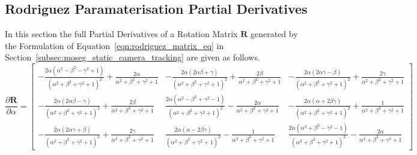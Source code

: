 \label{appendix:mathematical}
\begin{landscape}
\subsection{Rodriguez Paramaterisation Partial Derivatives}
In this section the full Partial Derivatives of a Rotation Matrix \(\bm{R}\)
generated by the Formulation of Equation~\ref{eqn:rodriguez_matrix_eq} in
Section~\ref{subsec:moseg_static_camera_tracking} are given as follows.
\begin{equation}
  \label{eqn:rodrigues_full_alpha_deriv}
  \frac{\partial \bm{R}}{\partial \alpha} =
    \begin{bmatrix}
      - \frac{2 \alpha \left(\alpha^{2} - \beta^{2} - \gamma^{2} +
          1\right)}{\left(\alpha^{2} + \beta^{2} + \gamma^{2} + 1\right)^{2}} +
      \frac{2 \alpha}{\alpha^{2} + \beta^{2} + \gamma^{2} + 1} &
      - \frac{2 \alpha \left(2 \alpha \beta + \gamma\right)}{\left(\alpha^{2} +
          \beta^{2} + \gamma^{2} + 1\right)^{2}} + \frac{2 \beta}{\alpha^{2} +
        \beta^{2} + \gamma^{2} + 1} &
      - \frac{2 \alpha \left(2 \alpha \gamma - \beta\right)}{\left(\alpha^{2} +
          \beta^{2} + \gamma^{2} + 1\right)^{2}}
      + \frac{2 \gamma}{\alpha^{2} + \beta^{2} + \gamma^{2} + 1}\\
      -\frac{2 \alpha \left(2 \alpha \beta - \gamma\right)}{\left(\alpha^{2} +
          \beta^{2} + \gamma^{2} + 1\right)^{2}} + \frac{2 \beta}{\alpha^{2} +
        \beta^{2} + \gamma^{2} + 1} &
      \frac{2 \alpha \left(\alpha^{2} - \beta^{2} + \gamma^{2} - 1\right)}
      {\left(\alpha^{2} + \beta^{2} + \gamma^{2} + 1\right)^{2}} - \frac{2 \alpha}
      {\alpha^{2} + \beta^{2} + \gamma^{2} + 1} &
      - \frac{2 \alpha \left(\alpha + 2 \beta \gamma\right)}
      {\left(\alpha^{2} + \beta^{2} + \gamma^{2} + 1\right)^{2}} +
      \frac{1}{\alpha^{2} + \beta^{2} + \gamma^{2} + 1}\\
      - \frac{2 \alpha \left(2 \alpha \gamma + \beta\right)}{\left(\alpha^{2} +
          \beta^{2} + \gamma^{2} + 1\right)^{2}} + \frac{2 \gamma}{\alpha^{2} +
        \beta^{2} + \gamma^{2} + 1} &
      \frac{2 \alpha \left(\alpha - 2 \beta \gamma\right)}
      {\left(\alpha^{2} + \beta^{2} + \gamma^{2} + 1\right)^{2}} -
      \frac{1}{\alpha^{2} + \beta^{2} + \gamma^{2} + 1} &
      \frac{2 \alpha \left(\alpha^{2} + \beta^{2} - \gamma^{2} - 1\right)}
      {\left(\alpha^{2} + \beta^{2} + \gamma^{2} + 1\right)^{2}} - \frac{2 \alpha}
      {\alpha^{2} + \beta^{2} + \gamma^{2} + 1}
    \end{bmatrix}
\end{equation}


\end{landscape}
